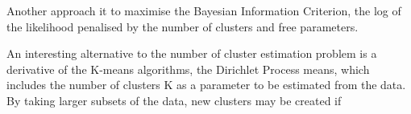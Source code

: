 Another approach it to maximise the Bayesian Information Criterion, the log of the likelihood penalised by the number of clusters and free parameters.


An interesting alternative to the number of cluster estimation problem is a derivative of the K-means algorithms,
the Dirichlet Process means, which includes the number of clusters
K as a parameter to be estimated from the data.
By taking larger subsets of the data, new clusters may be created if 


%
%


